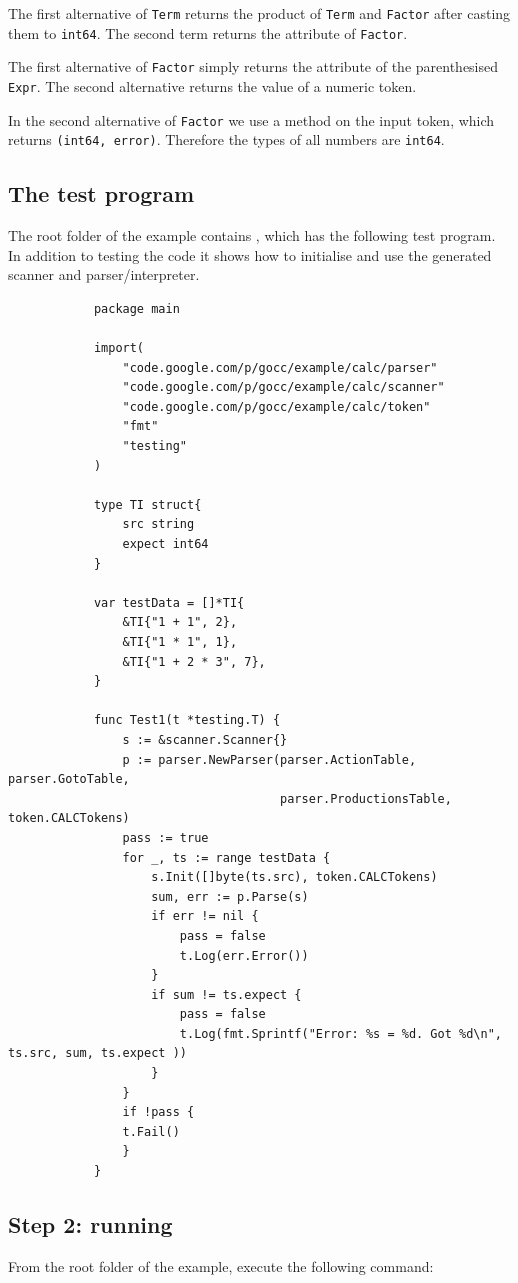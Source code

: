 \documentclass[12pt]{article}
\begin{document}
		The first alternative of \verb|Term| returns the product of \verb|Term| and \verb|Factor| after casting them to \verb|int64|. The second term returns the attribute of \verb|Factor|.

		The first alternative of \verb|Factor| simply returns the attribute of the parenthesised \verb|Expr|. The second alternative returns the value of a numeric token.

		In the second alternative of \verb|Factor| we use a method on the input token, which returns 
		\verb|(int64, error)|. Therefore the types of all numbers are \verb|int64|.

	\subsection{The test program}
		The root folder of the  example contains , which has the following test program. In addition to testing the code it shows how to initialise and use the generated scanner and parser/interpreter.

		\begin{verbatim}
			package main

			import(
			    "code.google.com/p/gocc/example/calc/parser"
			    "code.google.com/p/gocc/example/calc/scanner"
			    "code.google.com/p/gocc/example/calc/token"
			    "fmt"
			    "testing"
			)

			type TI struct{
			    src string
			    expect int64
			}

			var testData = []*TI{
			    &TI{"1 + 1", 2},
			    &TI{"1 * 1", 1},
			    &TI{"1 + 2 * 3", 7},
			}

			func Test1(t *testing.T) {
			    s := &scanner.Scanner{}
			    p := parser.NewParser(parser.ActionTable, parser.GotoTable, 
			                          parser.ProductionsTable, token.CALCTokens)
			    pass := true
			    for _, ts := range testData {
			        s.Init([]byte(ts.src), token.CALCTokens)
			        sum, err := p.Parse(s)
			        if err != nil {
			            pass = false
			            t.Log(err.Error())
			        }
			        if sum != ts.expect {
			            pass = false
			            t.Log(fmt.Sprintf("Error: %s = %d. Got %d\n", ts.src, sum, ts.expect ))
			        }
			    }
			    if !pass {
			    t.Fail()
			    }
			}

		\end{verbatim}

	\subsection{Step 2: running }
		From the root folder of the  example, execute the following command:
\end{document}
